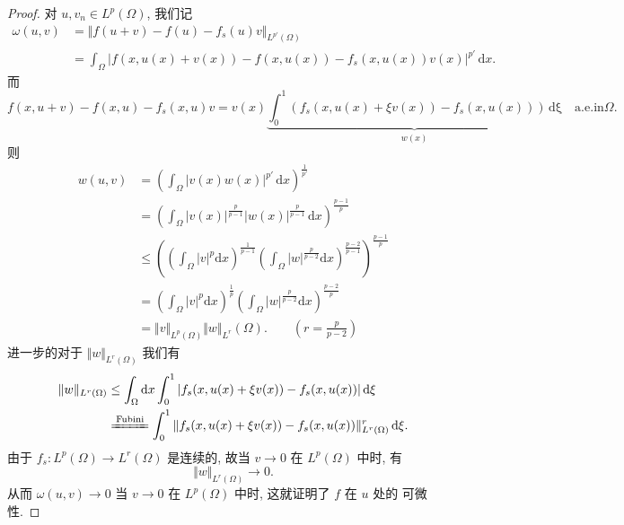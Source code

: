 \documentclass[11pt]{ctexart}
\begin{document}
\begin{proof}
  对 $u,v_{n} \in L^{p}(\Omega)$, 我们记
  \begin{equation*}
    \begin{aligned}
      \omega(u,v) &= \Vert f(u+v) - f(u) -f_{s}(u)v \Vert_{L^{p'}(\Omega)}\\
      &= \int_{\Omega} |f(x,u(x)+v(x)) - f(x,u(x)) -f_{s}(x,u(x))v(x)|^{p'} \, \mathrm{d}x.
    \end{aligned}
  \end{equation*}
  而
  \begin{equation*}
    f(x,u+v) - f(x,u) -f_{s}(x,u)v = v(x) \underbrace{\int_{0}^{1} (f_{s}(x,u(x)+\xi v(x)) - f_{s}(x,u(x))) \, \mathrm{d\xi}}_{w(x)} \quad \mathrm{a.e. in } \Omega.
  \end{equation*}
  则
  \begin{equation*}
    \begin{aligned}
      w(u,v) &= \left(\int_{\Omega} |v(x) w(x)|^{p'} \, \mathrm{d}x \right)^{\frac{1}{p'}}\\
      &= \left(\int_{\Omega} |v(x)|^{\frac{p}{p-1}} |w(x)|^{\frac{p}{p-1}} \, \mathrm{d}x\right)^{\frac{p-1}{p}}\\
      &\leq \left( \left( \int_{\Omega} |v|^{p}\mathrm{d}x \right)^{\frac{1}{p-1}} \left( \int_{\Omega} |w|^{\frac{p}{p-2}}\mathrm{d}x \right)^{\frac{p-2}{p-1}}  \right)^{\frac{p-1}{p}}\\
      &= \left( \int_{\Omega} |v|^{p}\mathrm{d}x \right)^{\frac{1}{p}} \left( \int_{\Omega} |w|^{\frac{p}{p-2}}\mathrm{d}x \right)^{\frac{p-2}{p}}\\
      &= \Vert v \Vert_{L^{p}(\Omega)} \Vert w \Vert_{L^{r}}(\Omega). \quad \quad(r = \frac{p}{p-2})
    \end{aligned}
  \end{equation*}
  进一步的对于 $\Vert w \Vert_{L^{r}(\Omega)}$ 我们有
  \begin{equation*}
    \begin{aligned}
      \Vert w \Vert_{L^{r}(\Omega)} &\leq \int_{\Omega} \mathrm{d}x \int_{0}^{1} |f_{s}(x,u(x)+\xi v(x)) - f_{s}(x,u(x))| \, \mathrm{d}\xi\\
      &\xlongequal{\text{Fubini}} \int_{0}^{1} \Vert f_{s}(x,u(x)+\xi v(x)) - f_{s}(x,u(x)) \Vert_{L^{r}(\Omega)}^{r}\, \mathrm{d}\xi.
    \end{aligned}
  \end{equation*}
  由于 $f_{s}: L^{p}(\Omega) \to L^{r}(\Omega)$ 是连续的, 故当 $v \to 0$ 在 $L^{p}(\Omega)$ 中时, 有
  \begin{equation*}
    \Vert w \Vert_{L^{r}(\Omega)} \to 0.
  \end{equation*}
  从而 $\omega(u,v) \to 0$ 当 $v \to 0$ 在 $L^{p}(\Omega)$ 中时, 这就证明了 $f$ 在 $u$ 处的 \Frechet 可微性.
\end{proof}
\end{document}
